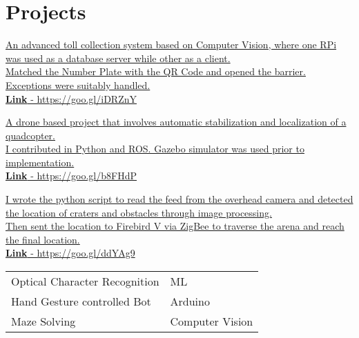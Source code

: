 \documentclass[]{deedy-resume-openfont}
\begin{document}
\begin{minipage}[t]{0.66\textwidth}

\section{Projects}
\href{https://www.youtube.com/watch?v=NjGZAbjNFC8}{
\textbullet{} An advanced toll collection system based on Computer Vision, where one RPi was used as a database server while other as a client. \\
\textbullet{} Matched the Number Plate with the QR Code and opened the barrier. \\
\textbullet{} Exceptions were suitably handled. \\
{\selectfont\bfseries Link} - https://goo.gl/iDRZnY
\sectionsep}

\href{https://github.com/sakshamkatiyar/chaser_drone}{
\textbullet{} A drone based project that involves automatic stabilization and localization of a quadcopter. \\
\textbullet{} I contributed in Python and ROS. Gazebo simulator was used prior to implementation. \\
{\selectfont\bfseries Link} - https://goo.gl/b8FHdP
\sectionsep}

\href{https://github.com/sakshamkatiyar/cross_a_crater}{
\textbullet{} I wrote the python script to read the feed from the overhead camera and detected the location of craters and obstacles through image processing. \\
\textbullet{} Then sent the location to Firebird V via ZigBee to traverse the arena and reach the final location. \\
{\selectfont\bfseries Link} - https://goo.gl/ddYAg9
\sectionsep}

\begin{tabular}{ll}
    \textbullet{} Optical Character Recognition & ML \\
    \textbullet{} Hand Gesture controlled Bot & Arduino \\
    \textbullet{} Maze Solving & Computer Vision
\end{tabular}


\end{minipage}
\end{document}
